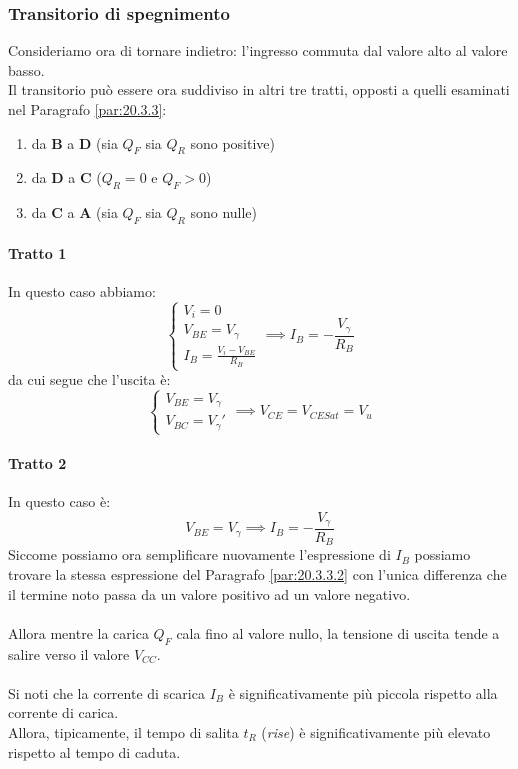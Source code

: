 \documentclass{article}
\numberwithin{equation}{subsection}
\begin{document}
	\subsubsection{Transitorio di spegnimento}
	Consideriamo ora di tornare indietro: l'ingresso commuta dal valore alto al valore basso.\\
	Il transitorio può essere ora suddiviso in altri tre tratti, opposti a quelli esaminati nel Paragrafo \ref{par:20.3.3}:
	\begin{enumerate}
		\item da \textbf{B} a \textbf{D} (sia $Q_F$ sia $Q_R$ sono positive)
		\item da \textbf{D} a \textbf{C} ($Q_R = 0$ e $Q_F > 0$)
		\item da \textbf{C} a \textbf{A} (sia $Q_F$ sia $Q_R$ sono nulle)
	\end{enumerate}
	\paragraph{Tratto 1}
	In questo caso abbiamo:
	\[ \begin{cases} V_i = 0 \\ V_{BE} = V_\gamma \\ I_B = \frac{V_i - V_{BE}}{R_B} \end{cases} \implies I_B = -\frac{V_\gamma}{R_B} \]
	da cui segue che l'uscita è:
	\[ \begin{cases} V_{BE} = V_\gamma \\ V_{BC} = V_\gamma' \end{cases} \implies V_{CE} = V_{CESat} = V_u \]
	\paragraph{Tratto 2}
	In questo caso è:
	\[ V_{BE} = V_\gamma \implies I_B = -\frac{V_\gamma}{R_B} \]
	Siccome possiamo ora semplificare nuovamente l'espressione di $I_B$ possiamo trovare la stessa espressione del Paragrafo \ref{par:20.3.3.2} con l'unica differenza che il termine noto passa da un valore positivo ad un valore negativo.\\\\
	Allora mentre la carica $Q_F$ cala fino al valore nullo, la tensione di uscita tende a salire verso il valore $V_{CC}$.\\\\
	Si noti che la corrente di scarica $I_B$ è significativamente più piccola rispetto alla corrente di carica.\\
	Allora, tipicamente, il tempo di salita $t_R$ (\textit{rise}) è significativamente più elevato rispetto al tempo di caduta.
\end{document}
